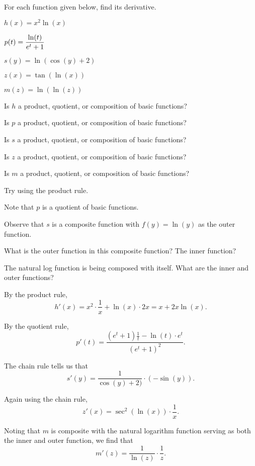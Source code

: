 \begin{activity} \label{A:2.8.1}  
For each function given below, find its derivative.
\ba
	   \item $h(x) = x^2\ln(x)$
	   \item  $p(t) = \displaystyle \frac{\ln(t)}{e^t + 1}$
           \item $s(y) = \ln(\cos(y) + 2)$
           \item $z(x) = \tan(\ln(x))$
           \item $m(z) = \ln(\ln(z))$
\ea
\end{activity}
\begin{smallhint}
\ba
	   \item Is $h$ a product, quotient, or composition of basic functions?
	   \item Is $p$ a product, quotient, or composition of basic functions?
	   \item Is $s$ a product, quotient, or composition of basic functions?
	   \item Is $z$ a product, quotient, or composition of basic functions?
	   \item Is $m$ a product, quotient, or composition of basic functions?
\ea
\end{smallhint}
\begin{bighint}
\ba
	   \item Try using the product rule.
	   \item Note that $p$ is a quotient of basic functions.
	   \item Observe that $s$ is a composite function with $f(y) = \ln(y)$ as the outer function.
	   \item What is the outer function in this composite function?  The inner function?
	   \item The natural log function is being composed with itself.  What are the inner and outer functions?
\ea
\end{bighint}
\begin{activitySolution}
\ba
	   \item By the product rule, 
	   $$h'(x) = x^2\cdot \frac{1}{x} + \ln(x) \cdot 2x = x + 2x\ln(x).$$
	   \item By the quotient rule, 
	   $$p'(t) = \frac{(e^t + 1) \frac{1}{t} - \ln(t) \cdot e^t}{(e^t + 1)^2}.$$
           \item The chain rule tells us that
           $$s'(y) = \frac{1}{\cos(y) + 2)} \cdot (-\sin(y)).$$
           \item Again using the chain rule,
           $$z'(x) = \sec^2(\ln(x)) \cdot \frac{1}{x}.$$
           \item Noting that $m$ is composite with the natural logarithm function serving as both the inner and outer function, we find that
           $$m'(z) = \frac{1}{\ln(z)} \cdot \frac{1}{z}.$$
\ea
\end{activitySolution}
\aftera